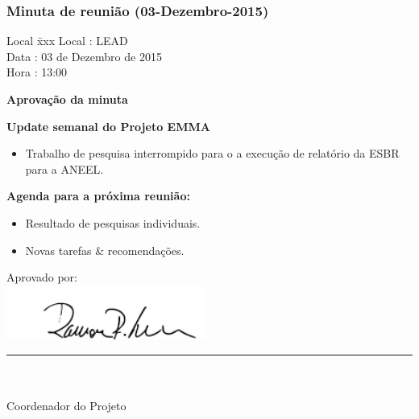 \subsubsection{Minuta de reunião (03-Dezembro-2015)}

\begin{tabbing}
  Local \= xxx \kill
  Local \> : LEAD \\
  Data  \> : 03 de Dezembro de 2015 \\
  Hora  \> : 13:00
\end{tabbing} 


\textbf{Aprovação da minuta}

\textbf{Update semanal do Projeto EMMA}
   									
						
	\begin{itemize}
			\item Trabalho de pesquisa interrompido para o a execução de relatório da
			ESBR para a ANEEL.
			\end{itemize}
		
					
			

\textbf{Agenda para a próxima reunião:}
  \begin{itemize}
    \item Resultado de pesquisas individuais.
    \item Novas tarefas \& recomendações.
  \end{itemize}


\vspace{5mm}%
\parbox[t]{70mm}{
  Aprovado por: \\[5mm]
  \centering
  \includegraphics[width=65mm]{figs/logo/assinatura-ramon.png} \\[-4mm]
  \rule[2mm]{70mm}{0.1mm} \\
  \ramon \\[1mm]
  Coordenador do Projeto \\
}

\fim